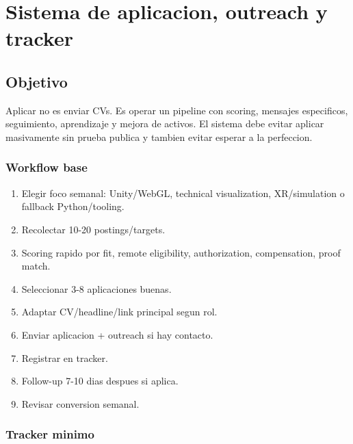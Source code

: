 \chapter{Sistema de aplicacion, outreach y tracker}

\section{Objetivo}


Aplicar no es enviar CVs. Es operar un pipeline con scoring, mensajes especificos, seguimiento, aprendizaje y mejora de activos. El sistema debe evitar aplicar masivamente sin prueba publica y tambien evitar esperar a la perfeccion.


\subsection{Workflow base}


\begin{enumerate}
\item Elegir foco semanal: Unity/WebGL, technical visualization, XR/simulation o fallback Python/tooling.
\item Recolectar 10-20 postings/targets.
\item Scoring rapido por fit, remote eligibility, authorization, compensation, proof match.
\item Seleccionar 3-8 aplicaciones buenas.
\item Adaptar CV/headline/link principal segun rol.
\item Enviar aplicacion + outreach si hay contacto.
\item Registrar en tracker.
\item Follow-up 7-10 dias despues si aplica.
\item Revisar conversion semanal.
\end{enumerate}


\subsection{Tracker minimo}


